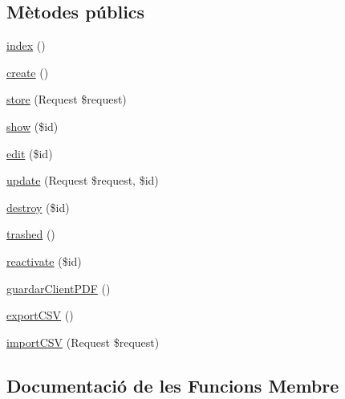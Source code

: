 \subsection*{Mètodes públics}
\begin{DoxyCompactItemize}
\item 
\mbox{\hyperlink{class_app_1_1_http_1_1_controllers_1_1_clients_controller_a149eb92716c1084a935e04a8d95f7347}{index}} ()
\item 
\mbox{\hyperlink{class_app_1_1_http_1_1_controllers_1_1_clients_controller_a435e7d7525d4bcd0ed5e34a469f3adf6}{create}} ()
\item 
\mbox{\hyperlink{class_app_1_1_http_1_1_controllers_1_1_clients_controller_a9ef485163104597c12185b53cdacf638}{store}} (Request \$request)
\item 
\mbox{\hyperlink{class_app_1_1_http_1_1_controllers_1_1_clients_controller_ae4914d07a9bbe4aede7a5dea759f6287}{show}} (\$id)
\item 
\mbox{\hyperlink{class_app_1_1_http_1_1_controllers_1_1_clients_controller_a459ed16587e3a50b39b672c7e473abc5}{edit}} (\$id)
\item 
\mbox{\hyperlink{class_app_1_1_http_1_1_controllers_1_1_clients_controller_affb03cc19897a1800a0f411264d6c7cc}{update}} (Request \$request, \$id)
\item 
\mbox{\hyperlink{class_app_1_1_http_1_1_controllers_1_1_clients_controller_a726fa8a4b4b187b9ca32ba427aac8137}{destroy}} (\$id)
\item 
\mbox{\hyperlink{class_app_1_1_http_1_1_controllers_1_1_clients_controller_a27e5c7c270aebe0baec29a042d450df4}{trashed}} ()
\item 
\mbox{\hyperlink{class_app_1_1_http_1_1_controllers_1_1_clients_controller_a796ea4077bb7fe14af9f92e4ed083556}{reactivate}} (\$id)
\item 
\mbox{\hyperlink{class_app_1_1_http_1_1_controllers_1_1_clients_controller_afae9830398418f6a786a2c3829fbe622}{guardar\+Client\+P\+DF}} ()
\item 
\mbox{\hyperlink{class_app_1_1_http_1_1_controllers_1_1_clients_controller_a85eb498786fcc18b539cb141f988b18b}{export\+C\+SV}} ()
\item 
\mbox{\hyperlink{class_app_1_1_http_1_1_controllers_1_1_clients_controller_ac4558929a5961fdc5574d0cd847561a6}{import\+C\+SV}} (Request \$request)
\end{DoxyCompactItemize}


\subsection{Documentació de les Funcions Membre}
\mbox{\label{class_app_1_1_http_1_1_controllers_1_1_clients_controller_a435e7d7525d4bcd0ed5e34a469f3adf6}} 
